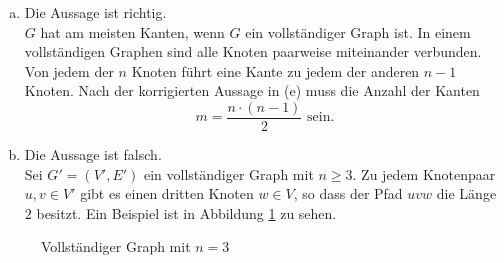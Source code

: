 \documentclass[a4paper]{scrartcl}
\begin{document}
\begin{enumerate}[(a)]
    \item
        Die Aussage ist richtig. \\
        $G$ hat am meisten Kanten, wenn $G$ ein vollständiger Graph ist.
        In einem vollständigen Graphen sind alle Knoten paarweise miteinander
        verbunden.
        Von jedem der $n$ Knoten führt eine Kante zu jedem der anderen $n-1$
        Knoten.
        Nach der korrigierten Aussage in (e) muss die Anzahl der Kanten
        \begin{equation}
            m = \frac{n \cdot (n-1)}{2} \text{ sein.}
        \end{equation}
        

    \item
        Die Aussage ist falsch. \\
        Sei $G' = (V', E')$ ein vollständiger Graph mit $n \geq 3$.
        Zu jedem Knotenpaar $u,v \in V'$ gibt es  einen dritten Knoten
        $w \in V$, so dass der Pfad $uvw$ die Länge $2$ besitzt.
        Ein Beispiel ist in Abbildung \ref{fig:3complete} zu sehen.


\end{enumerate}
\begin{figure}[h]
    \centering
    \caption{Vollständiger Graph mit $n = 3$}
    \label{fig:3complete}
\end{figure}
\end{document}

